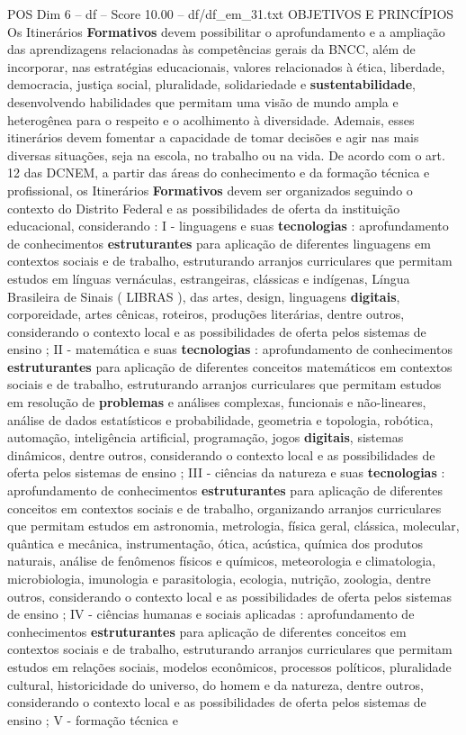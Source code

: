 \begin{textsample}{POS Dim 6 – df – Score 10.00 – df/df\_em\_31.txt}  \label{ex:f6_pos_124}
OBJETIVOS E PRINCÍPIOS Os Itinerários \textbf{Formativos} devem possibilitar o aprofundamento e a ampliação das aprendizagens relacionadas às competências gerais da BNCC, além de incorporar, nas estratégias educacionais, valores relacionados à ética, liberdade, democracia, justiça social, pluralidade, solidariedade e \textbf{sustentabilidade}, desenvolvendo habilidades que permitam uma visão de mundo ampla e heterogênea para o respeito e o acolhimento à diversidade.
Ademais, esses itinerários devem fomentar a capacidade de tomar decisões e agir nas mais diversas situações, seja na escola, no trabalho ou na vida.
De acordo com o art. 12 das DCNEM, a partir das áreas do conhecimento e da formação técnica e profissional, os Itinerários \textbf{Formativos} devem ser organizados seguindo o contexto do Distrito Federal e as possibilidades de oferta da instituição educacional, considerando : I - linguagens e suas \textbf{tecnologias} : aprofundamento de conhecimentos \textbf{estruturantes} para aplicação de diferentes linguagens em contextos sociais e de trabalho, estruturando arranjos curriculares que permitam estudos em línguas vernáculas, estrangeiras, clássicas e indígenas, Língua Brasileira de Sinais ( LIBRAS ), das artes, design, linguagens \textbf{digitais}, corporeidade, artes cênicas, roteiros, produções literárias, dentre outros, considerando o contexto local e as possibilidades de oferta pelos sistemas de ensino ; II - matemática e suas \textbf{tecnologias} : aprofundamento de conhecimentos \textbf{estruturantes} para aplicação de diferentes conceitos matemáticos em contextos sociais e de trabalho, estruturando arranjos curriculares que permitam estudos em resolução de \textbf{problemas} e análises complexas, funcionais e não-lineares, análise de dados estatísticos e probabilidade, geometria e topologia, robótica, automação, inteligência artificial, programação, jogos \textbf{digitais}, sistemas dinâmicos, dentre outros, considerando o contexto local e as possibilidades de oferta pelos sistemas de ensino ; III - ciências da natureza e suas \textbf{tecnologias} : aprofundamento de conhecimentos \textbf{estruturantes} para aplicação de diferentes conceitos em contextos sociais e de trabalho, organizando arranjos curriculares que permitam estudos em astronomia, metrologia, física geral, clássica, molecular, quântica e mecânica, instrumentação, ótica, acústica, química dos produtos naturais, análise de fenômenos físicos e químicos, meteorologia e climatologia, microbiologia, imunologia e parasitologia, ecologia, nutrição, zoologia, dentre outros, considerando o contexto local e as possibilidades de oferta pelos sistemas de ensino ; IV - ciências humanas e sociais aplicadas : aprofundamento de conhecimentos \textbf{estruturantes} para aplicação de diferentes conceitos em contextos sociais e de trabalho, estruturando arranjos curriculares que permitam estudos em relações sociais, modelos econômicos, processos políticos, pluralidade cultural, historicidade do universo, do homem e da natureza, dentre outros, considerando o contexto local e as possibilidades de oferta pelos sistemas de ensino ; V - formação técnica e 
\end{textsample}
